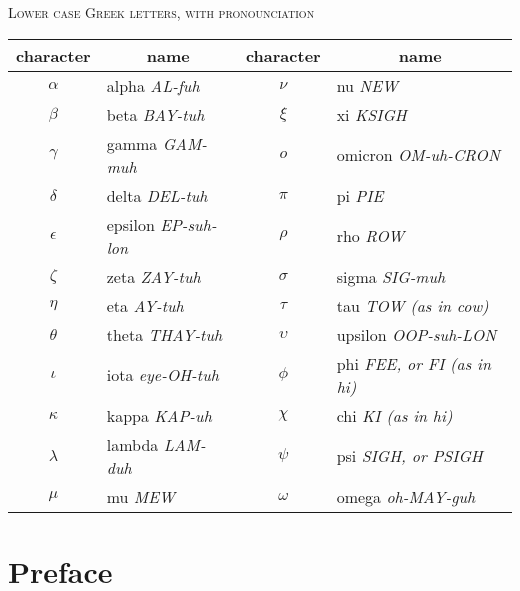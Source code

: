 \documentclass{ibl}
\begin{document}
\vspace*{\fill}
\begin{center}
  {\large\textsc{Lower case Greek letters, with pronounciation}}
    \\[3ex]
  \newcommand{\pronounced}[1]{\hspace*{.2em}\small\textit{#1}}
  \begin{tabular}{cl@{\hspace*{3em}}cl}
    character &\multicolumn{1}{c}{name}       
    &character  &\multicolumn{1}{c}{name}  \\ 
    \hline
     \( \alpha  \) &alpha \pronounced{AL-fuh}  
       &\( \nu     \)  &nu  \pronounced{NEW}       \\
     \( \beta   \) &beta  \pronounced{BAY-tuh}     
       &\( \xi  \)  &xi   \pronounced{KSIGH}    \\ 
     \( \gamma  \) &gamma  \pronounced{GAM-muh}    
       &\( o       \) &omicron  \pronounced{OM-uh-CRON}  \\
     \( \delta  \) &delta  \pronounced{DEL-tuh}   
       &\( \pi \) &pi  \pronounced{PIE}     \\
     \( \epsilon\) &epsilon  \pronounced{EP-suh-lon}   
       &\( \rho \) &rho  \pronounced{ROW}    \\
     \( \zeta   \) &zeta   \pronounced{ZAY-tuh}    
       &\( \sigma  \) &sigma  \pronounced{SIG-muh}  \\
     \( \eta    \) &eta  \pronounced{AY-tuh}      
       &\( \tau \) &tau  \pronounced{TOW (as in cow)}    \\
     \( \theta  \) &theta  \pronounced{THAY-tuh}    
       &\( \upsilon\) &upsilon  \pronounced{OOP-suh-LON}  \\
     \( \iota \) &iota \pronounced{eye-OH-tuh}   
       &\( \phi    \) &phi  \pronounced{FEE, or FI (as in hi)}    \\
     \( \kappa  \) &kappa  \pronounced{KAP-uh}  
       &\( \chi    \) &chi  \pronounced{KI (as in hi)}    \\
     \( \lambda \) &lambda  \pronounced{LAM-duh}  
       &\( \psi    \) &psi \pronounced{SIGH, or PSIGH}    \\
     \( \mu  \)  &mu  \pronounced{MEW}     
       &\( \omega  \) &omega  \pronounced{oh-MAY-guh}  
  \end{tabular}
\end{center}





\chapter*{Preface}
\end{document}
